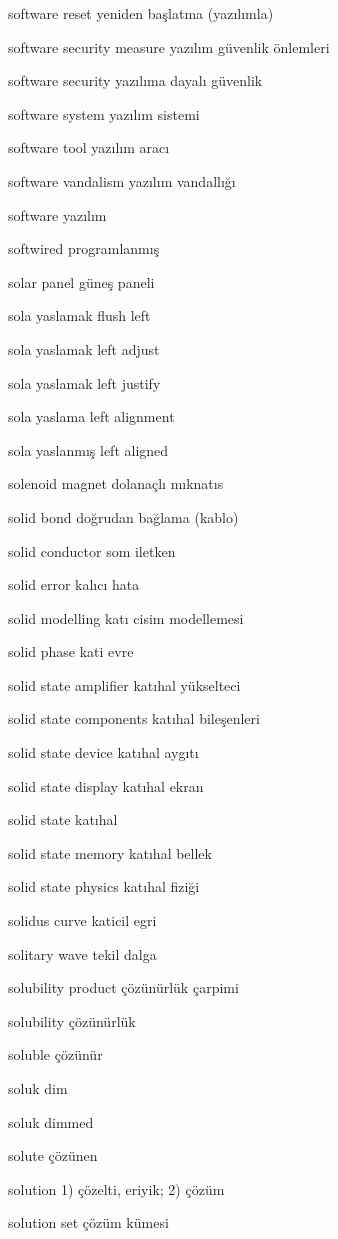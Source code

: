 \documentclass[12pt,fleqn]{article}\usepackage{../../common}
\begin{document}
software reset yeniden başlatma (yazılımla)

software security measure yazılım güvenlik önlemleri

software security yazılıma dayalı güvenlik

software system yazılım sistemi

software tool yazılım aracı

software vandalism yazılım vandallığı

software yazılım

softwired programlanmış

solar panel güneş paneli

sola yaslamak flush left

sola yaslamak left adjust

sola yaslamak left justify

sola yaslama left alignment

sola yaslanmış left aligned

solenoid magnet dolanaçlı mıknatıs

solid bond doğrudan bağlama (kablo)

solid conductor som iletken

solid error kalıcı hata

solid modelling katı cisim modellemesi

solid phase kati evre

solid state amplifier katıhal yükselteci

solid state components katıhal bileşenleri

solid state device katıhal aygıtı

solid state display katıhal ekran

solid state katıhal

solid state memory katıhal bellek

solid state physics katıhal fiziği

solidus curve katicil egri

solitary wave tekil dalga

solubility product çözünürlük çarpimi

solubility çözünürlük

soluble çözünür

soluk dim

soluk dimmed

solute çözünen

solution 1) çözelti, eriyik; 2) çözüm

solution set çözüm kümesi
\end{document}
